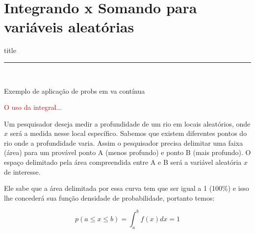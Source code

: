 \documentclass{beamer}
\begin{document}

\section{Integrando x Somando para variáveis aleatórias}
    \begin{frame}[plain]
        \vfill
      \centering
      \begin{beamercolorbox}[sep=8pt,center,shadow=true,rounded=true]{title}
        \insertsectionhead\par%
        \color{oxfordblue}\noindent\rule{10cm}{1pt} \\
        \LARGE{\faFileTextO}
      \end{beamercolorbox}
      \vfill
  \end{frame}






\begin{frame}{Exemplo de aplicação de probs em va contínua}

\textcolor{red}{O uso da integral...}

Um pesquisador deseja medir a profundidade de um rio em locais aleatórios, onde $x$ será a medida nesse local específico. Sabemos que existem diferentes pontos do rio onde a profundidade varia. Assim o pesquisador precisa delimitar uma faixa (área) para um provável ponto A (menos profundo) e ponto B (mais profundo). O espaço delimitado pela área compreendida entre A e B será a variável aleatória $x$ de interesse.

Ele sabe que a área delimitada por essa curva tem que ser igual a 1 (100\%) e isso lhe concederá sua função densidade de probabilidade, portanto temos:

$$
p(a\leq x \leq b)=\displaystyle\int^{b}_{a}f(x)dx=1
$$



    
\end{frame}
\end{document}
